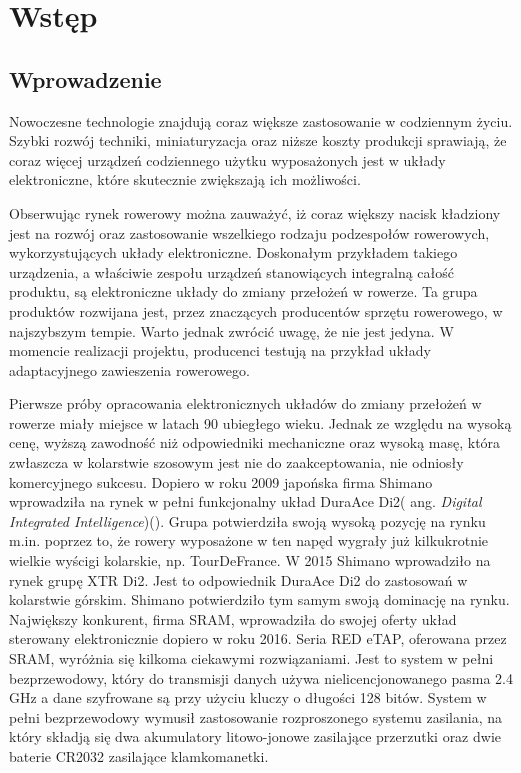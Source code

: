 \chapter{Wstęp}
\label{cha:Wstęp}

\section{Wprowadzenie}
\label{sec:Wprowadzenie}
Nowoczesne technologie znajdują coraz większe zastosowanie w codziennym życiu. Szybki rozwój techniki, miniaturyzacja oraz niższe koszty produkcji sprawiają, że coraz więcej urządzeń codziennego użytku wyposażonych jest w układy elektroniczne, które skutecznie zwiększają ich możliwości. 

Obserwując rynek rowerowy można zauważyć, iż coraz większy nacisk kładziony jest na rozwój oraz zastosowanie wszelkiego rodzaju podzespołów rowerowych, wykorzystujących układy elektroniczne. Doskonałym przykładem takiego urządzenia, a właściwie zespołu urządzeń stanowiących integralną całość produktu, są elektroniczne układy do zmiany przełożeń w rowerze. Ta grupa produktów rozwijana jest, przez znaczących producentów sprzętu rowerowego, w najszybszym tempie. Warto jednak zwrócić uwagę, że nie jest jedyna. W momencie realizacji projektu, producenci testują na przykład układy adaptacyjnego zawieszenia rowerowego.   

Pierwsze próby opracowania elektronicznych układów do zmiany przełożeń w rowerze miały miejsce w latach 90 ubiegłego wieku. Jednak ze względu na wysoką cenę, wyższą zawodność niż odpowiedniki mechaniczne oraz wysoką masę, która zwłaszcza w kolarstwie szosowym jest nie do zaakceptowania, nie odniosły komercyjnego sukcesu. Dopiero w roku 2009 japońska firma Shimano wprowadziła na rynek w pełni funkcjonalny układ DuraAce Di2( ang. {\em Digital Integrated Intelligence})(\cite{shimanoHistory}). Grupa potwierdziła swoją wysoką pozycję na rynku m.in. poprzez to, że rowery wyposażone w ten napęd wygrały już kilkukrotnie wielkie wyścigi kolarskie, np. TourDeFrance. W 2015 Shimano wprowadziło na rynek grupę XTR Di2. Jest to odpowiednik DuraAce Di2 do zastosowań w kolarstwie górskim. Shimano potwierdziło tym samym swoją dominację na rynku. Największy konkurent, firma SRAM, wprowadziła do swojej oferty układ sterowany elektronicznie dopiero w roku 2016. Seria RED eTAP, oferowana przez SRAM, wyróżnia się kilkoma ciekawymi rozwiązaniami. Jest to system w pełni bezprzewodowy, który do transmisji danych używa nielicencjonowanego pasma 2.4 GHz a dane szyfrowane są przy użyciu kluczy o długości 128 bitów. System w pełni bezprzewodowy wymusił zastosowanie rozproszonego systemu zasilania, na który składją się dwa akumulatory litowo-jonowe zasilające przerzutki oraz dwie baterie CR2032 zasilające klamkomanetki\cite{bikeWorld}.

